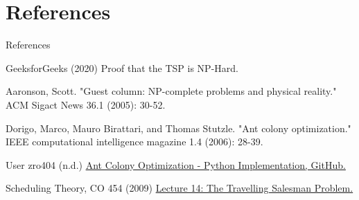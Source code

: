 \documentclass[aspectratio=169,xcolor=dvipsnames, t]{beamer}
\begin{document}
\section{References}
\begin{frame}{References}
	\vspace{-5mm}
	\footnotesize{
		\begin{thebibliography}{99}
			 GeeksforGeeks (2020)
			\newblock Proof that the TSP is NP-Hard.

			 Aaronson, Scott.
			\newblock "Guest column: NP-complete problems and physical reality." ACM Sigact News 36.1 (2005): 30-52.

			 Dorigo, Marco, Mauro Birattari, and Thomas Stutzle. 
			\newblock "Ant colony optimization." IEEE computational intelligence magazine 1.4 (2006): 28-39.

			 User zro404 (n.d.)
			\newblock \href{https://github.com/zro404/ACO}{Ant Colony Optimization - Python Implementation, GitHub.}

			 Scheduling Theory, CO 454 (2009)
			\newblock \href{https://www.cs.dartmouth.edu/~deepc/Courses/S09/Lectures/lecture14.pdf?utm_source=chatgpt.com}{Lecture 14: The Travelling Salesman Problem.}
		\end{thebibliography}
	}
\end{frame}

\makefinalpage
\end{document}
